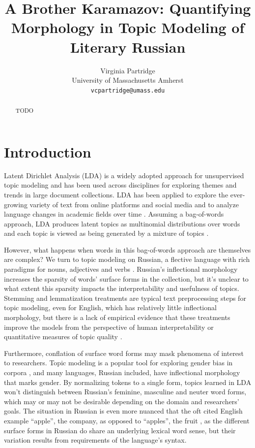 \documentclass[11pt,a4paper]{article}
\title{A Brother Karamazov: Quantifying Morphology in Topic Modeling of Literary Russian}
\author{Virginia Partridge \\
  University of Massachusetts Amherst\\
  \texttt{vcpartridge@umass.edu}
}
\date{}
\begin{document}
\maketitle
\begin{abstract}
TODO
\end{abstract}

\section{Introduction}
Latent Dirichlet Analysis (LDA) is a widely adopted approach for unsupervised topic modeling and has been used across disciplines for exploring themes and trends in large document collections. LDA has been applied to explore the ever-growing variety of text from online platforms and social media and to analyze language changes in academic fields over time \cite{koltsova2013,mcfarland2013differentiating, vogel-jurafsky-2012-said, mitrofanova2015probabilistic}. Assuming a bag-of-words approach, LDA produces latent topics as multinomial distributions over words and each topic is viewed as being generated by a mixture of topics \cite{blei2003,steyvers2007probabilistic}.

However, what happens when words in this bag-of-words approach are themselves are complex? We turn to topic modeling on Russian, a flective language with rich paradigms for nouns, adjectives and verbs \cite{wade2020comprehensive}. Russian's inflectional morphology increases the sparsity of words' surface forms in the collection, but it's unclear to what extent this sparsity impacts the interpretability and usefulness of topics. Stemming and lemmatization treatments are typical text preprocessing steps for topic modeling, even for English, which has relatively little inflectional morphology, but there is a lack of empirical evidence that these treatments improve the models from the perspective of human interpretability or quantitative measures of topic quality \cite{schofield-mimno-2016-comparing}.

Furthermore, conflation of surface word forms may mask phenomena of interest to researchers. Topic modeling is a popular tool for exploring gender bias in corpora \cite{vogel-jurafsky-2012-said,devinney-etal-2020-semi}, and many languages, Russian included, have inflectional morphology that marks gender. By normalizing tokens to a single form, topics learned in LDA won't distinguish between Russian's feminine, masculine and neuter word forms, which may or may not be desirable depending on the domain and researchers' goals. The situation in Russian is even more nuanced that the oft cited English example ``apple'', the company, as opposed to ``apples'', the fruit \cite{schofield-mimno-2016-comparing}, as the different surface forms in Russian do share an underlying lexical word sense, but their variation results from requirements of the language's syntax.
\end{document}
